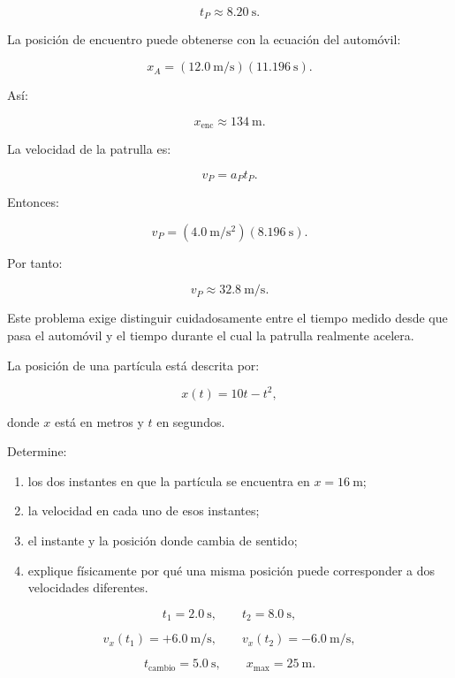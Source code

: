 \begin{explicacion}
\[ \boxed{t_P\approx\SI{8.20}{\second}}. \]

La posición de encuentro puede obtenerse con la ecuación del automóvil:

\[
x_A
=
(\SI{12.0}{\meter\per\second})
(\SI{11.196}{\second}).
\]

Así:

\[ \boxed{x_{\mathrm{enc}}\approx\SI{134}{\meter}}. \]

La velocidad de la patrulla es:

\[
v_P
=
a_Pt_P.
\]

Entonces:

\[
v_P
=
(\SI{4.0}{\meter\per\second\squared})
(\SI{8.196}{\second}).
\]

Por tanto:

\[ \boxed{v_P\approx\SI{32.8}{\meter\per\second}}. \]

Este problema exige distinguir cuidadosamente entre el tiempo medido desde que pasa el automóvil y el tiempo durante el cual la patrulla realmente acelera.
\end{explicacion}


\begin{ejercicio}
La posición de una partícula está descrita por:

\[ x(t)=10t-t^2, \]

donde \(x\) está en metros y \(t\) en segundos.

Determine:

\begin{enumerate}[label=\alph*)]
    \item los dos instantes en que la partícula se encuentra en \(x=\SI{16}{\meter}\);
    \item la velocidad en cada uno de esos instantes;
    \item el instante y la posición donde cambia de sentido;
    \item explique físicamente por qué una misma posición puede corresponder a dos velocidades diferentes.
\end{enumerate}
\end{ejercicio}

\begin{respuesta}
\[
t_1=\SI{2.0}{\second},
\qquad
t_2=\SI{8.0}{\second},
\]

\[
v_x(t_1)=+\SI{6.0}{\meter\per\second},
\qquad
v_x(t_2)=-\SI{6.0}{\meter\per\second},
\]

\[
t_{\mathrm{cambio}}=\SI{5.0}{\second},
\qquad
x_{\max}=\SI{25}{\meter}.
\]
\end{respuesta}

